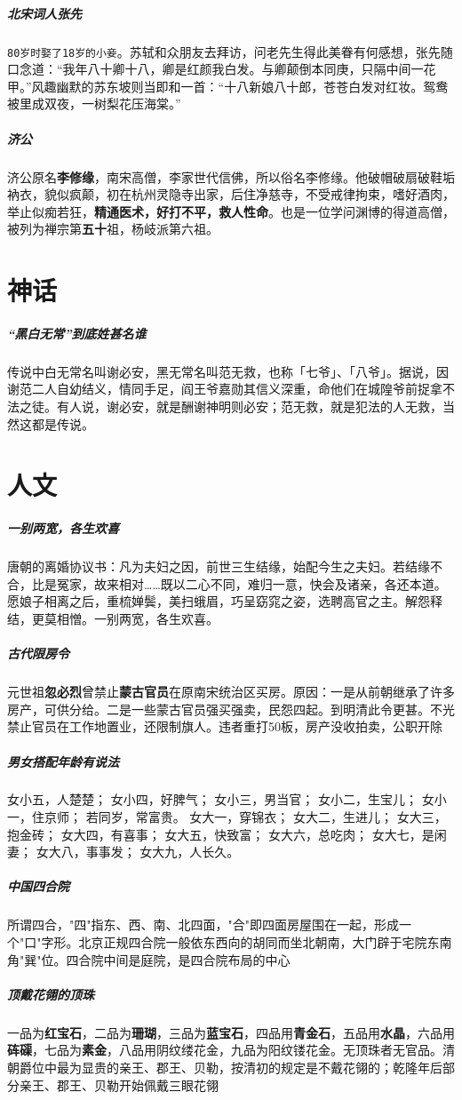 \documentclass[UTF8,a4paper,12pt]{ctexbook}
\begin{document}
		\subparagraph{北宋词人张先}\verb|80岁时娶了18岁的小妾|。苏轼和众朋友去拜访，问老先生得此美眷有何感想，张先随口念道：“我年八十卿十八，卿是红颜我白发。与卿颠倒本同庚，只隔中间一花甲。”风趣幽默的苏东坡则当即和一首：“十八新娘八十郎，苍苍白发对红妆。鸳鸯被里成双夜，一树梨花压海棠。” 
		
		\subparagraph{济公}济公原名\textbf{李修缘}，南宋高僧，李家世代信佛，所以俗名李修缘。他破帽破扇破鞋垢衲衣，貌似疯颠，初在杭州灵隐寺出家，后住净慈寺，不受戒律拘束，嗜好酒肉，举止似痴若狂，\textbf{精通医术，好打不平，救人性命}。也是一位学问渊博的得道高僧，被列为禅宗第\textbf{五十}祖，杨岐派第六祖。
	\section{神话}
		\subparagraph{“黑白无常”到底姓甚名谁}传说中白无常名叫谢必安，黑无常名叫范无救，也称「七爷」、「八爷」。据说，因谢范二人自幼结义，情同手足，阎王爷嘉勋其信义深重，命他们在城隍爷前捉拿不法之徒。有人说，谢必安，就是酬谢神明则必安；范无救，就是犯法的人无救，当然这都是传说。
	
	
	\section{人文}
		\subparagraph{一别两宽，各生欢喜}唐朝的离婚协议书：凡为夫妇之因，前世三生结缘，始配今生之夫妇。若结缘不合，比是冤家，故来相对……既以二心不同，难归一意，快会及诸亲，各还本道。愿娘子相离之后，重梳婵鬓，美扫蛾眉，巧呈窈窕之姿，选聘高官之主。解怨释结，更莫相憎。一别两宽，各生欢喜。	
		
		\subparagraph{古代限房令}元世祖\textbf{忽必烈}曾禁止\textbf{蒙古官员}在原南宋统治区买房。原因：一是从前朝继承了许多房产，可供分给。二是一些蒙古官员强买强卖，民怨四起。到明清此令更甚。不光禁止官员在工作地置业，还限制旗人。违者重打50板，房产没收拍卖，公职开除
		
		\subparagraph{男女搭配年龄有说法}女小五，人楚楚； 女小四，好脾气； 女小三，男当官； 女小二，生宝儿； 女小一，住京师； 若同岁，常富贵。 女大一，穿锦衣； 女大二，生进儿； 女大三，抱金砖； 女大四，有喜事； 女大五，快致富； 女大六，总吃肉； 女大七，是闲妻； 女大八，事事发； 女大九，人长久。
		
		\subparagraph{中国四合院}所谓四合，"四"指东、西、南、北四面，"合"即四面房屋围在一起，形成一个"口"字形。北京正规四合院一般依东西向的胡同而坐北朝南，大门辟于宅院东南角"巽"位。四合院中间是庭院，是四合院布局的中心
		
		\subparagraph{顶戴花翎的顶珠}一品为\textbf{红宝石}，二品为\textbf{珊瑚}，三品为\textbf{蓝宝石}，四品用\textbf{青金石}，五品用\textbf{水晶}，六品用\textbf{砗磲}，七品为\textbf{素金}，八品用阴纹缕花金，九品为阳纹镂花金。无顶珠者无官品。清朝爵位中最为显贵的亲王、郡王、贝勒，按清初的规定是不戴花翎的；乾隆年后部分亲王、郡王、贝勒开始佩戴三眼花翎
		
\end{document}
